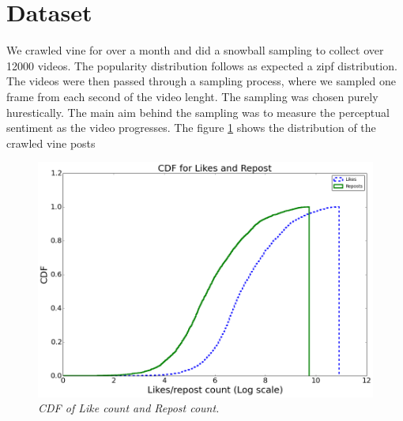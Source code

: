 \section{ Dataset }
We crawled vine for over a month and did a snowball sampling to collect over 12000 videos. The popularity distribution follows as expected a zipf distribution. The videos were then passed through a sampling process, where we sampled one frame from each second of the video lenght. The sampling was chosen purely hurestically. The main aim behind the sampling was to measure the perceptual sentiment as the video progresses. The figure \ref{fig:CDF_posts} shows the distribution of the crawled vine posts 

\begin{figure}
\centering
\includegraphics[width=\columnwidth]{plots/CDF_Like_reposts}
\caption{\textsl{ CDF of Like count and Repost count.}}
\label{fig:CDF_posts}
\end{figure}
